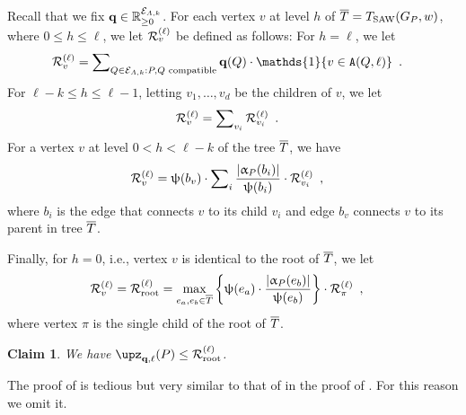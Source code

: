 \documentclass[11pt,reqno]{amsart}
\numberwithin{equation}{section}
\newtheorem{claim}[theorem]{Claim}
\newcommand{\cE}{{\mathcal{E}}}
\newcommand{\applegreen}[1]{ {\color{applegreen}#1}}
\newcommand{\amethyst}[1]{{\color{amethyst}#1} }
\newcommand{\blue}[1]{{\color{blue}#1}}
\newcommand{\bluepigment}[1]{{\color{blue(pigment)}#1}}
\newcommand{\capri}[1]{{\color{capri}#1}}
\newcommand{\cadmiumorange}[1]{{\color{cadmiumorange}#1}}
\newcommand{\deeppink}[1]{{\color{deeppink}#1}}
\newcommand{\electricviolet}[1]{{\color{electricviolet}#1}}
\newcommand{\goldenbrown}[1]{{\color{goldenbrown}#1}}
\newcommand{\iris}[1]{{\color{iris}#1}}
\newcommand{\Ind}{\mathds{1}}
\newcommand{\ExtV}{\iris{\cE}}
\newcommand{\Tsaw}{T_{\rm SAW}}
\newcommand{\cp}{{\tt A}}
\newcommand{\abs}[1]{\blue{|}#1\blue{|}}
\renewcommand{\applegreen}[1]{#1}
\renewcommand{\amethyst}[1]{#1}
\renewcommand{\blue}[1]{#1}
\renewcommand{\bluepigment}[1]{#1}
\renewcommand{\capri}[1]{#1}
\renewcommand{\cadmiumorange}[1]{#1}
\renewcommand{\deeppink}[1]{#1}
\renewcommand{\electricviolet}[1]{#1}
\renewcommand{\goldenbrown}[1]{#1}
\renewcommand{\iris}[1]{#1}
\newcommand{\kb}{\deeppink{b}}
\newcommand{\kd}{\goldenbrown{d}}
\newcommand{\ke}{\blue{e}}
\newcommand{\kh}{\cadmiumorange{h}}
\newcommand{\ki}{\capri{i}}
\newcommand{\kk}{\bluepigment{k}}
\newcommand{\kell}{{\color{green(pigment)}\ell}}%
\newcommand{\kP}{\goldenbrown{P}}
\newcommand{\kQ}{\amethyst{Q}}
\newcommand{\kv}{\electricviolet{v}}
\newcommand{\kw}{\blue{w}}
\renewcommand{\kb}{b}
\renewcommand{\kd}{d}
\renewcommand{\ke}{e}
\renewcommand{\kh}{h}
\renewcommand{\ki}{i}
\renewcommand{\kk}{k}
\renewcommand{\kell}{\ell}
\renewcommand{\kP}{P}
\renewcommand{\kQ}{Q}
\renewcommand{\kv}{v}
\renewcommand{\kw}{w}
\newcommand{\infweight}{\upalpha}
\begin{document}
%
Recall that we fix $\vtest \in \mathbb{R}^{\ExtV_{\Lambda,\kk}}_{\geq 0}$.  For each vertex $\kv$ at level $\kh$ of $\TPP=\Tsaw(\gext{G}{\kP}, \kw)$, where 
$0\leq \kh\leq  \kell$, we let $\subcont_{\kv}$ be defined as follows: 
For $\kh=\kell$, we let 
\begin{align}\label{eq:BaseRvUzDef}
\subcont_{\kv} &= \sum\nolimits_{\kQ\in \ExtV_{\Lambda,\kk}: \kP, \kQ \textrm{ compatible}} 
\vtest(\kQ) \cdot \Ind\{\kv \in \cp(\kQ, \kell) \}\enspace.
\end{align}
%
%
For $\kell-\kk \leq \kh \leq \kell-1$, letting $\kv_1,\ldots, \kv_{\kd}$ be the children of $\kv$, we let 
\begin{align}\label{eq:1STEPRvUzDef}
\subcont_{\kv} &= \sum\nolimits_{\kv_i} \subcont_{\kv_i}\enspace.
\end{align}
For a vertex $\kv$ at level $0<\kh<\kell-\kk$ of the tree $\overline{T}$, we have
\begin{align}\label{eq:RecurRUZ}
\subcont_{\kv} & = \chiofh(\kb_{\kv}) \cdot \sum\nolimits_{\ki} \frac{\abs{\infweight_{\kP}(\kb_{\ki})}}{\chiofh(\kb_{\ki})} \cdot \subcont_{\kv_{\ki}}\enspace,
\end{align}
where $\kb_{\ki}$ is the edge that connects $\kv$ to its child $\kv_{\ki}$ and edge $\kb_{\kv}$ connects $\kv$ to its parent in tree $\overline{T}$. 

Finally, for $\kh=0$, i.e., vertex $\kv$ is identical to the root of $\overline{T}$, we let 
\begin{align}\label{eq:RecurRUZRoot}
\subcont_\kv=\subcont_{\rm root} &= \max_{\ke_a,\ke_b\in \TPP} \left\{ \chiofh(\ke_a) \cdot \frac{ \abs{\infweight_{\kP}(\ke_b)}}{\chiofh(\ke_b)} \right\} \cdot \subcont_{\pi} \enspace,
\end{align}
where vertex $\pi$ is the single child of the root of $\overline{T}$.



\begin{claim}\label{claim:ZvecQLVsCalRV}
We have $\SimpleFvec_{\vtest,\kell}(\kP)\leq \subcont_{\rm root}$. 
\end{claim}

The proof of  is tedious but very similar to that of  in the proof of .
For this reason we omit it.  
\end{document}
